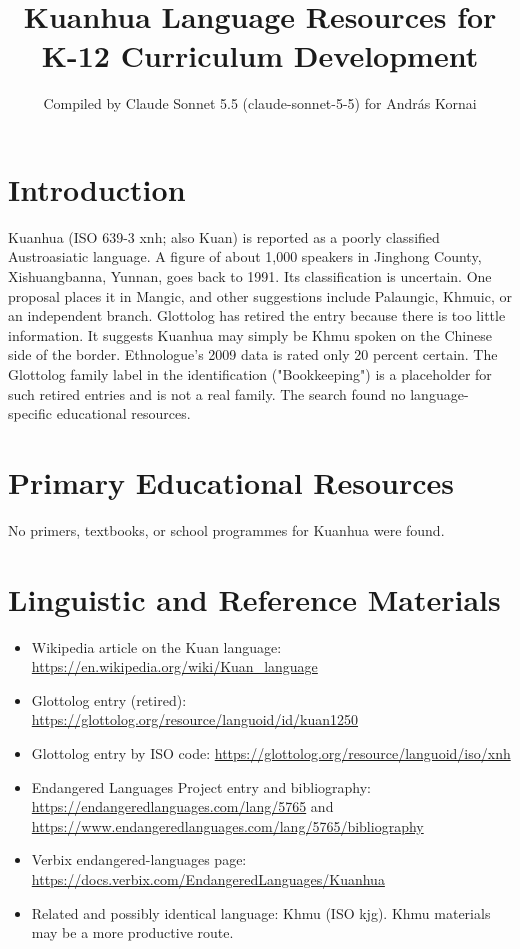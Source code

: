 \documentclass[12pt]{article}
\title{Kuanhua Language Resources for K-12 Curriculum Development}
\author{Compiled by Claude Sonnet 5.5 (claude-sonnet-5-5) for Andr\'as Kornai}
\date{}
\begin{document}
\maketitle

\section{Introduction}
Kuanhua (ISO 639-3 xnh; also Kuan) is reported as a poorly classified Austroasiatic language. A figure of about 1,000 speakers in Jinghong County, Xishuangbanna, Yunnan, goes back to 1991. Its classification is uncertain. One proposal places it in Mangic, and other suggestions include Palaungic, Khmuic, or an independent branch. Glottolog has retired the entry because there is too little information. It suggests Kuanhua may simply be Khmu spoken on the Chinese side of the border. Ethnologue's 2009 data is rated only 20 percent certain. The Glottolog family label in the identification ("Bookkeeping") is a placeholder for such retired entries and is not a real family. The search found no language-specific educational resources.

\section{Primary Educational Resources}
No primers, textbooks, or school programmes for Kuanhua were found.

\section{Linguistic and Reference Materials}
\begin{itemize}
\item Wikipedia article on the Kuan language: \url{https://en.wikipedia.org/wiki/Kuan_language}
\item Glottolog entry (retired): \url{https://glottolog.org/resource/languoid/id/kuan1250}
\item Glottolog entry by ISO code: \url{https://glottolog.org/resource/languoid/iso/xnh}
\item Endangered Languages Project entry and bibliography: \url{https://endangeredlanguages.com/lang/5765} and \url{https://www.endangeredlanguages.com/lang/5765/bibliography}
\item Verbix endangered-languages page: \url{https://docs.verbix.com/EndangeredLanguages/Kuanhua}
\item Related and possibly identical language: Khmu (ISO kjg). Khmu materials may be a more productive route.
\end{itemize}
\end{document}
